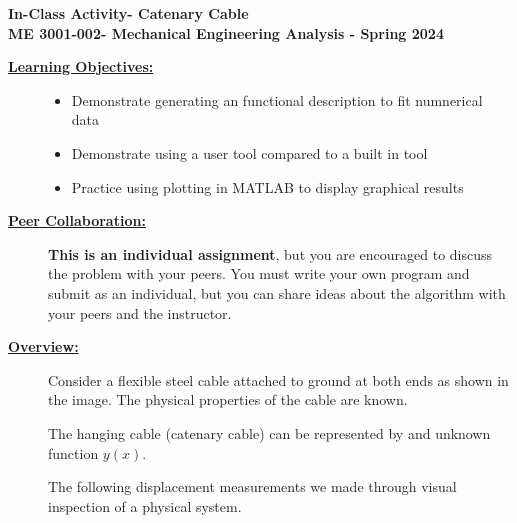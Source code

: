 \documentclass[12pt]{article}
\newcommand{\COURNAME}{ME 3001-002}
\newcommand{\CURRTERM}{Spring 2024} %
\newcommand{\ANUM}{8} %
\newcommand{\activitytitle}{Catenary Cable} %
\begin{document}
\thispagestyle{plain}

\begin{center}
   {\bf \Large In-Class Activity\hspc\ANUM\hspc - \activitytitle}\vspace{3mm}\\
   {\bf \large \COURNAME - Mechanical Engineering Analysis - \CURRTERM} \vspace{5mm}\\
\end{center}

\begin{description}


\item[\textbf{\underline{Learning Objectives:}}] \hfill \vspace{0mm}

\begin{itemize}
	\item Demonstrate generating an functional description to fit numnerical data
	\item Demonstrate using a user tool compared to a built in tool
	\item Practice using plotting in MATLAB to display graphical results
\end{itemize}

\item[\textbf{\underline{Peer Collaboration:}}] \hfill \vspace{0mm}
	
	{\bf This is an individual assignment}, but you are encouraged to discuss the problem with your peers. You must write your own program and submit as an individual, but you can share ideas about the algorithm with your peers and the instructor.

\item[\textbf{\underline{Overview:}}] \hfill \vspace{0mm}

	\begin{multicols}{2}
	Consider a flexible steel cable attached to ground at both ends as shown in the image. The physical properties of the cable are known. 

   The hanging cable (catenary cable) can be represented by and unknown function $y(x)$. 

   The following displacement measurements we made through visual inspection of a physical system. 


\end{multicols}
\end{description}
\end{document}
